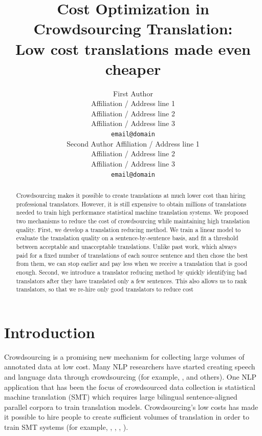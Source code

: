 \documentclass[11pt,letterpaper]{article}
\title{Cost Optimization in Crowdsourcing Translation:\\ Low cost translations made even cheaper}
\author{First Author \\
  Affiliation / Address line 1 \\
  Affiliation / Address line 2 \\
  Affiliation / Address line 3 \\
  {\tt email@domain} \\\And
  Second Author 
  Affiliation / Address line 1 \\
  Affiliation / Address line 2 \\
  Affiliation / Address line 3 \\
  {\tt email@domain} \\}
\date{}
\begin{document}
\maketitle
\begin{abstract}
Crowdsourcing makes it possible to create translations at much lower cost than hiring professional translators. However, it is still expensive to obtain millions of translations needed to train high performance statistical machine translation systems. We proposed two mechanisms to reduce the cost of crowdsourcing while maintaining high translation quality.
First, we develop a translation reducing method. We train a linear model to evaluate the translation quality on a sentence-by-sentence basis, and fit a threshold between acceptable and unacceptable translations. Unlike past work, which always paid for a fixed number of translations of each source sentence and then chose the best from them, we can stop earlier and pay less when we receive a translation that is good enough. Second, we introduce a translator reducing method by quickly identifying bad translators after they have translated only a few sentences. This also allows us to rank translators, so that we re-hire only good translators to reduce cost   


 \end{abstract}

\section{Introduction}

Crowdsourcing is a promising new mechanism for collecting large volumes of annotated data at low cost.  %
Many NLP researchers have started creating speech and language data through crowdsourcing (for example,  ,  and others).  One NLP application that has been the focus of crowdsourced data collection is statistical machine translation (SMT) which requires large bilingual sentence-aligned parallel corpora to train translation models.  Crowdsourcing's low costs has made it possible to hire people to create sufficient volumes of translation in order to train SMT systems (for example,   ,  ,  , ).
\end{document}
